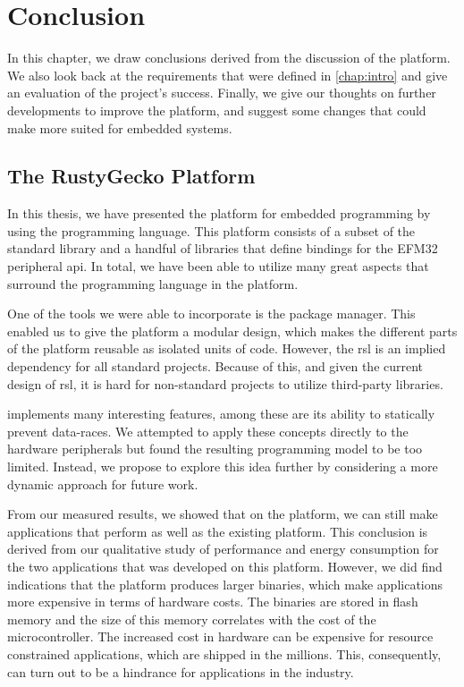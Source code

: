 
\chapter{Conclusion}
\label{chap:conclusion}

In this chapter, we draw conclusions derived from the discussion of the {\rg} platform.
We also look back at the requirements that were defined in \autoref{chap:intro} and give an evaluation of the project's success.
Finally, we give our thoughts on further developments to improve the {\rg} platform, and suggest some changes that could make {\rust} more suited for embedded systems.

\section{The RustyGecko Platform}

In this thesis, we have presented the {\rg} platform for embedded programming by using the {\rust} programming language.
This platform consists of a subset of the {\rust} standard library and a handful of libraries that define bindings for the EFM32 peripheral \gls{api}.
In total, we have been able to utilize many great aspects that surround the {\rust} programming language in the {\rg} platform.

One of the tools we were able to incorporate is the {\cargo} package manager.
This enabled us to give the {\rg} platform a modular design, which makes the different parts of the platform reusable as isolated units of code.
However, the \gls{rsl} is an implied dependency for all standard {\rust} projects.
Because of this, and given the current design of \gls{rsl}, it is hard for non-standard projects to utilize third-party libraries.

{\rust} implements many interesting features, among these are its ability to statically prevent data-races.
We attempted to apply these concepts directly to the hardware peripherals but found the resulting programming model to be too limited.
Instead, we propose to explore this idea further by considering a more dynamic approach for future work.

From our measured results, we showed that on the {\rg} platform, we can still make applications that perform as well as the existing {\C} platform.
This conclusion is derived from our qualitative study of performance and energy consumption for the two applications that was developed on this platform.
However, we did find indications that the platform produces larger binaries, which make {\rust} applications more expensive in terms of hardware costs.
The binaries are stored in flash memory and the size of this memory correlates with the cost of the microcontroller.
The increased cost in hardware can be expensive for resource constrained applications, which are shipped in the millions.
This, consequently, can turn out to be a hindrance for applications in the industry.

